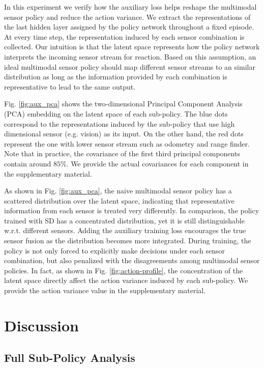 \documentclass[../thesis.tex]{subfiles}
\begin{document}
In this experiment we verify how the auxiliary loss helps reshape the multimodal sensor policy and reduce the action variance. 
We extract the representations of the last hidden layer assigned by the policy network throughout a fixed episode. At every time step, the representation induced by each sensor combination is collected. 
Our intuition is that the latent space represents how the policy network interprets the incoming sensor stream for reaction. Based on this assumption, an ideal multimodal sensor policy should map different sensor streams to an similar distribution as long as the information provided by each combination is representative to lead to the same output.

Fig. \ref{fig:aux_pca} shows the two-dimensional Principal Component Analysis (PCA) embedding on the latent space of each sub-policy. The blue dots correspond to the representations induced by the sub-policy that use high dimensional sensor (e.g. vision) as its input. On the other hand, the red dots represent the one with lower sensor stream such as odometry and range finder. Note that in practice, the covariance of the first third principal components contain around $85\%$. We provide the actual covariances for each component in the supplementary material.

As shown in Fig. \ref{fig:aux_pca}, the naive multimodal sensor policy has a scattered distribution over the latent space, indicating that representative information from each sensor is treated very differently. In comparison, the policy trained with SD has a concentrated distribution, yet it is still distinguishable w.r.t. different sensors. Adding the auxiliary training loss encourages the true sensor fusion as the distribution becomes more integrated. During training, the policy is not only forced to explicitly make decisions under each sensor combination, but also penalized with the disagreements among multimodal sensor policies. In fact, as shown in Fig. \ref{fig:action-profile}, the concentration of the latent space directly affect the action variance induced by each sub-policy. We provide the action variance value in the supplementary material.


\section{Discussion} \label{sec:mdrl-discussion}


\subsection{Full Sub-Policy Analysis}
\label{SD-full-config}
\end{document}
